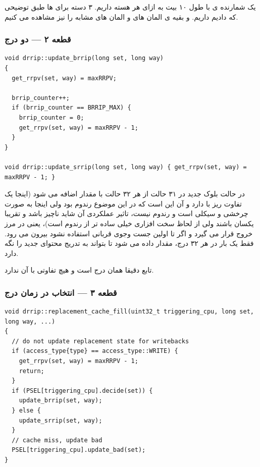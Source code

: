 \documentclass[12pt,a4paper]{article}
\begin{document}
یک شمارنده ی  با طول ۱۰ بیت به ازای هر هسته داریم. ۳ دسته برای  ها طبق توضیحی که دادیم داریم. و بقیه ی المان های  و المان های مشابه  را نیز مشاهده می کنیم.

\subsubsection{قطعه ۲ — دو  درج}

\begin{latin}
\begin{lstlisting}
void drrip::update_brrip(long set, long way)
{
  get_rrpv(set, way) = maxRRPV;

  brrip_counter++;
  if (brrip_counter == BRRIP_MAX) {
    brrip_counter = 0;
    get_rrpv(set, way) = maxRRPV - 1;
  }
}

void drrip::update_srrip(long set, long way) { get_rrpv(set, way) = maxRRPV - 1; }
\end{lstlisting}
\end{latin}

در حالت  بلوک جدید در ۳۱ حالت از هر ۳۲ حالت با مقدار  اضافه می شود (اینجا یک تفاوت ریز با  دارد و آن این است که در  این موضوع رندوم بود ولی اینجا به صورت چرخشی و سیکلی است و رندوم نیست، تاثیر عملکردی آن شاید ناچیز باشد و تقریبا یکسان باشند ولی از لحاظ سخت افزاری خیلی ساده تر از رندوم است)، یعنی در مرز خروج قرار می گیرد و اگر تا اولین جست وجوی قربانی استفاده نشود بیرون می رود. فقط یک بار در هر ۳۲ درج، مقدار  داده می شود تا  بتواند به تدریج محتوای جدید را نگه دارد.

تابع  دقیقا همان درج  است و هیچ تفاوتی با آن ندارد.

\subsubsection{قطعه ۳ — انتخاب  در زمان درج}

\begin{latin}
\begin{lstlisting}
void drrip::replacement_cache_fill(uint32_t triggering_cpu, long set, long way, ...)
{
  // do not update replacement state for writebacks
  if (access_type{type} == access_type::WRITE) {
    get_rrpv(set, way) = maxRRPV - 1;
    return;
  }
  if (PSEL[triggering_cpu].decide(set)) {
    update_brrip(set, way);
  } else {
    update_srrip(set, way);
  }
  // cache miss, update bad
  PSEL[triggering_cpu].update_bad(set);
}
\end{lstlisting}
\end{latin}
\end{document}
